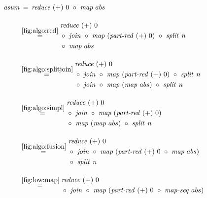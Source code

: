 \begin{figure*}[t]
\begin{align}
  \text{\textit{asum}}
  &\hspace{.2em}=\hspace{.2em} \Reduce\ (+)\ 0\ \circ\ \Map\ abs\\[1em]
  & \overset{\ref{fig:algo:red}}{\hspace{.2em}=\hspace{.2em}}
      \begin{aligned}
        & \Reduce\ (+)\ 0\\
        &\circ\ \MyJoin\ \circ\ \Map\ (\PartRed\ (+)\ 0)\ \circ\ \MySplit\ n\\
        &\circ\ \Map\ abs
      \end{aligned}\\[1em]
  & \overset{\ref{fig:algo:splitjoin}}{=\hspace{.2em}}
      \begin{aligned}
        & \Reduce\ (+)\ 0\\
        &\circ\ \MyJoin\ \circ\ \Map\ (\PartRed\ (+)\ 0)\ \circ\ \MySplit\ n\\
        &\circ\ \MyJoin\ \circ\ \Map\ (\Map\ abs)\ \circ\ \MySplit\ n
      \end{aligned}\\[1em]
  & \overset{\ref{fig:algo:simpl}}{=\hspace{.2em}}
      \begin{aligned}
        & \Reduce\ (+)\ 0\\
        &\circ\ \MyJoin\ \circ\ \Map\ (\PartRed\ (+)\ 0)\\
        &\circ\ \Map\ (\Map\ abs)\ \circ\ \MySplit\ n
      \end{aligned}\\[1em]
  & \overset{\ref{fig:algo:fusion}}{=\hspace{.2em}}
      \begin{aligned}
        & \Reduce\ (+)\ 0\\
        &\circ\ \MyJoin\ \circ\ \Map\ (\PartRed\ (+)\ 0\ \circ\ \Map\ abs)\\
        &\circ\ \MySplit\ n
      \end{aligned}\\[1em]
  & \overset{\ref{fig:low:map}}{=\hspace{.2em}}
      \begin{aligned}
        & \Reduce\ (+)\ 0\\
        &\circ\ \MyJoin\ \circ\ \Map\ (\PartRed\ (+)\ 0\ \circ\ \MapSeq\ abs)\\

\end{aligned}
\end{align}
\end{figure*}
